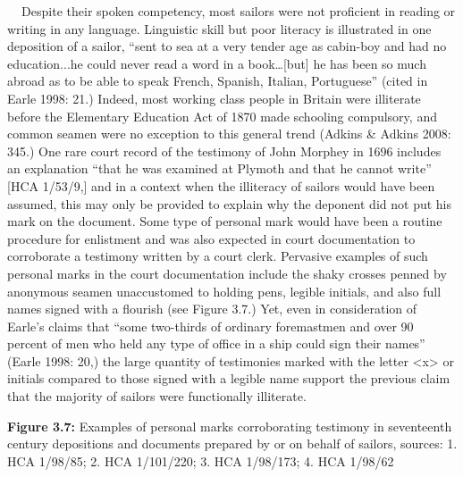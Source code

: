 \begin{styleStandard}
\textbf{\ \ }Despite their spoken competency, most sailors were not proficient in reading or writing in any language. Linguistic skill but poor literacy is illustrated in one deposition of a sailor, “sent to sea at a very tender age as cabin-boy and had no education...he could never read a word in a book…[but] he has been so much abroad as to be able to speak French, Spanish, Italian, Portuguese” (cited in Earle 1998: 21.) Indeed, most working class people in Britain were illiterate before the Elementary Education Act of 1870 made schooling compulsory, and common seamen were no exception to this general trend (Adkins \& Adkins 2008: 345.) One rare court record of the testimony of John Morphey in 1696 includes an explanation “that he was examined at Plymoth and that he cannot write” [HCA 1/53/9,] and in a context when the illiteracy of sailors would have been assumed, this may only be provided to explain why the deponent did not put his mark on the document. Some type of personal mark would have been a routine procedure for enlistment and was also expected in court documentation to corroborate a testimony written by a court clerk. Pervasive examples of such personal marks in the court documentation include the shaky crosses penned by anonymous seamen unaccustomed to holding pens, legible initials, and also full names signed with a flourish (see Figure 3.7.) Yet, even in consideration of Earle’s claims that “some two-thirds of ordinary foremastmen and over 90 percent of men who held any type of office in a ship could sign their names” (Earle 1998: 20,) the large quantity of testimonies marked with the letter {\textless}x{\textgreater} or initials compared to those signed with a legible name support the previous claim that the majority of sailors were functionally illiterate. 
\end{styleStandard}

\begin{styleStandard}
  [Warning: Image ignored] %
 
\end{styleStandard}

\begin{styleStandard}
\textbf{Figure 3.7: }Examples of personal marks corroborating testimony in seventeenth century depositions and documents prepared by or on behalf of sailors, sources: 1. HCA 1/98/85; 2. HCA 1/101/220; 3. HCA 1/98/173; 4. HCA 1/98/62
\end{styleStandard}

